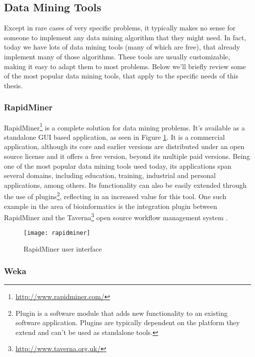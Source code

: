 \subsection{Data Mining Tools}\label{sec:mintools}

Except in rare cases of very specific problems, it typically makes no sense for
someone to implement any data mining algorithm that they might need. In fact,
today we have lots of data mining tools (many of which are free), that already
implement many of those algorithms. These tools are usually customizable, making
it easy to adapt them to most problems. Below we'll briefly review some of the
most popular data mining tools, that apply to the specific needs of this thesis.

\subsubsection{RapidMiner}

RapidMiner\footnote{\url{http://www.rapidminer.com/}} is a complete solution for
data mining problems. It's available as a standalone GUI based application, as
seen in Figure \ref{fig:rapidminer}. It is a commercial application, although
its core and earlier versions are distributed under an open source license and
it offers a free version, beyond its multiple paid versions. Being one of the
most popular data mining tools used today, its applications span several
domains, including education, training, industrial and personal applications,
among others. Its functionality can also be easily extended through the use of
plugins\footnote{Plugin is a software module that adds new functionality to an
existing software application. Plugins are typically dependent on the platform
they extend and can't be used as standalone tools.}, reflecting in an increased
value for this tool. One such example in the area of bioinformatics is the
integration plugin between RapidMiner and the
Taverna\footnote{\url{http://www.taverna.org.uk/}} open source workflow
management system \cite{Jupp2011}.

\begin{figure}[!htb]
  \begin{center}
    \leavevmode
    \texttt{[image: rapidminer]}
    \caption{RapidMiner user interface}
    \label{fig:rapidminer}
  \end{center}
\end{figure}

\subsubsection{Weka}

